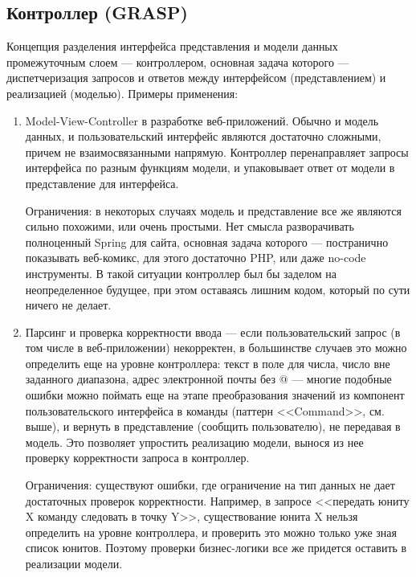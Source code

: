 \subsection*{Контроллер (GRASP)}
Концепция разделения интерфейса представления и модели данных промежуточным слоем --- контроллером,
основная задача которого --- диспетчеризация запросов и ответов
между интерфейсом (представлением) и реализацией (моделью).
Примеры применения:
\begin{enumerate}
    \item Model-View-Controller в разработке веб-приложений.
    Обычно и модель данных, и пользовательский интерфейс являются достаточно сложными,
    причем не взаимосвязанными напрямую.
    Контроллер перенаправляет запросы интерфейса по разным функциям модели,
    и упаковывает ответ от модели в представление для интерфейса.

    Ограничения: в некоторых случаях модель и представление все же являются сильно похожими,
    или очень простыми.
    Нет смысла разворачивать полноценный Spring для сайта,
    основная задача которого --- постранично показывать веб-комикс,
    для этого достаточно PHP,
    или даже no-code инструменты.
    В такой ситуации контроллер был бы заделом на неопределенное будущее,
    при этом оставаясь лишним кодом, который по сути ничего не делает.

    \item Парсинг и проверка корректности ввода --- если пользовательский запрос (в том числе в веб-приложении)
    некорректен, в большинстве случаев это можно определить еще на уровне контроллера:
    текст в поле для числа, число вне заданного диапазона, адрес электронной почты без @
    --- многие подобные ошибки можно поймать еще на этапе преобразования значений
    из компонент пользовательского интерфейса в команды (паттерн <<Command>>, см. выше),
    и вернуть в представление (сообщить пользователю), не передавая в модель.
    Это позволяет упростить реализацию модели, вынося из нее проверку корректности запроса в контроллер.

    Ограничения: существуют ошибки, где ограничение на тип данных не дает достаточных проверок корректности.
    Например, в запросе <<передать юниту X команду следовать в точку Y>>,
    существование юнита X нельзя определить на уровне контроллера,
    и проверить это можно только уже зная список юнитов.
    Поэтому проверки бизнес-логики все же придется оставить в реализации модели.
\end{enumerate}

